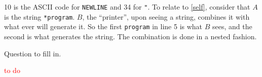 10 is the ASCII code for \texttt{NEWLINE} and 34 for \texttt{"}. To relate to \ref{self}, consider that $A$ is the string \texttt{*program}. $B$, the ``printer'', upon seeing a string, combines it with what ever will generate it. So the first \texttt{program} in line 5 is what $B$ sees, and the second is what generates the string. The combination is done in a nested fashion.

\setcounter{exercise}{10}

\begin{exercise}{6.11}
  Question to fill in.
\end{exercise}

\textcolor{red}{to do}
